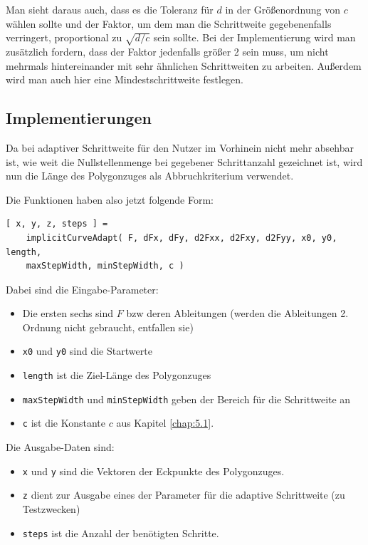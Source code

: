 \documentclass[a4paper,11pt,bibliography=totoc,listof=totoc,headinclude=true,cleardoublepage=empty,oneside]{scrartcl}
\begin{document}
Man sieht daraus auch, dass es die Toleranz für $d$ in der Größenordnung von $c$ wählen sollte und der Faktor, um dem man die Schrittweite gegebenenfalls verringert, proportional zu $\sqrt{d/c}$ sein sollte. Bei der Implementierung wird man zusätzlich fordern, dass der Faktor jedenfalls größer 2 sein muss, um nicht mehrmals hintereinander mit sehr ähnlichen Schrittweiten zu arbeiten. Außerdem wird man auch hier eine Mindestschrittweite festlegen.

\subsection{Implementierungen}
Da bei adaptiver Schrittweite für den Nutzer im Vorhinein nicht mehr absehbar ist, wie weit die Nullstellenmenge bei gegebener Schrittanzahl gezeichnet ist, wird nun die Länge des Polygonzuges als Abbruchkriterium verwendet.

Die Funktionen haben also jetzt folgende Form:
\begin{verbatim}
[ x, y, z, steps ] = 
    implicitCurveAdapt( F, dFx, dFy, d2Fxx, d2Fxy, d2Fyy, x0, y0, length,
    maxStepWidth, minStepWidth, c )
\end{verbatim}
Dabei sind die Eingabe-Parameter:
\begin{itemize}
	\item Die ersten sechs sind $F$ bzw deren Ableitungen (werden die Ableitungen 2. Ordnung nicht gebraucht, entfallen sie)
	\item \verb|x0| und \verb|y0| sind die Startwerte
	\item \verb|length| ist die Ziel-Länge des Polygonzuges
	\item \verb|maxStepWidth| und \verb|minStepWidth| geben der Bereich für die Schrittweite an
	\item \verb|c| ist die Konstante $c$ aus Kapitel \ref{chap:5.1}.
\end{itemize}

Die Ausgabe-Daten sind:
\begin{itemize}
	\item \verb|x| und \verb|y| sind die Vektoren der Eckpunkte des Polygonzuges.
	\item \verb|z| dient zur Ausgabe eines der Parameter für die adaptive Schrittweite (zu Testzwecken)
	\item \verb|steps| ist die Anzahl der benötigten Schritte.
\end{itemize}
\end{document}
